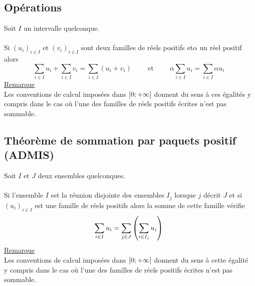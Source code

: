 \subsection{Opérations}
\begin{defprop}
    Soit \(I\) un intervalle quelconque.\\~\\
    Si \((u_i)_{i\in I}\) et \((v_i)_{i\in I}\) sont deux familles de réels positifs et\( \alpha\)  un réel positif alors
    \[\sum_{i\in I}u_i + \sum_{i\in I} v_i = \sum_{i\in I}(u_i + v_i)\qquad \text{  et }\qquad \alpha  \sum_{i\in I}u_i = \sum_{i\in I}\alpha u_i\]
    \underline{Remarque}\\
    Les conventions de calcul imposées dans \(\left[0;+\infty\right]\) donnent du sens à ces égalités y compris dans le cas où l’une des familles de réels positifs écrites n’est pas sommable.
\end{defprop}
\subsection{Théorème de sommation par paquets positif (ADMIS)}
\begin{theo}
    Soit \(I\) et \(J\) deux ensembles quelconques.\\~\\
    Si l’ensemble \(I\) est la réunion disjointe des ensembles \(I_j\) lorsque \(j\) décrit \(J\) et si \((u_i)_{i\in I}\) est une famille de réels positifs alors la somme de cette famille vérifie
    \[\sum_{i\in I}u_i = \sum_{j\in J} \left(\sum_{i\in I_j}u_i\right)\]
    \underline{Remarque}\\
    Les conventions de calcul imposées dans \(\left[0;+\infty\right]\) donnent du sens à cette égalité y compris dans le cas où l’une des familles de réels positifs écrites n’est pas sommable.
\end{theo}
